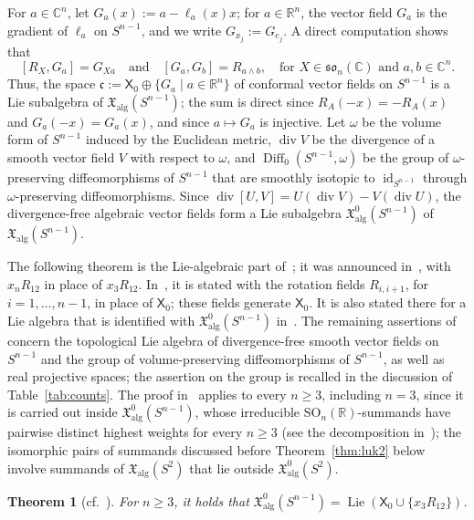 \documentclass{article}
\newcommand{\R}{\mathbb{R}}
\newcommand{\C}{\mathbb{C}}
\newcommand{\frakc}{\mathfrak{c}}
\newcommand{\xalg}{\mathfrak X_{\mathrm{alg}}}
\newcommand{\xalgz}{\mathfrak X^{0}_{\mathrm{alg}}}
\newcommand{\sX}{\mathsf{X}}
\newtheorem{theorem}{Theorem}
\theoremstyle{definition}
\theoremstyle{plain}
\begin{document}
For $a\in\C^n$, let $G_a(x):= a-\ell_a(x)x$; for $a\in\R^n$, the vector field $G_a$ is the gradient of $\ell_a$ on $S^{n-1}$, and we write $G_{x_j}:=G_{e_j}$.
A direct computation shows that
\begin{equation}\label{eq:conformal}
[R_X,G_a]=G_{Xa} \quad\mbox{and}\quad
[G_a,G_b]=R_{a\wedge b}, \quad\mbox{for } X\in\mathfrak{so}_n(\C)\mbox{ and }a,b\in\C^n.
\end{equation}
Thus, the space $\frakc:=\sX_0\oplus\{G_a \mid  a\in\R^n\}$ of conformal vector fields on $S^{n-1}$ is a Lie subalgebra of $\xalg(S^{n-1})$; the sum is direct since $R_A(-x)=-R_A(x)$ and $G_a(-x)=G_a(x)$, and since $a\mapsto G_a$ is injective.
 Let $\omega$ be the volume form of $S^{n-1}$ induced by the Euclidean metric, $\operatorname{div}V$ be the divergence of a smooth vector field $V$ with respect to $\omega$, and $\operatorname{Diff}_0(S^{n-1},\omega)$ be the group of $\omega$-preserving diffeomorphisms of $S^{n-1}$ that are smoothly isotopic to $\operatorname{id}_{S^{n-1}}$ through $\omega$-preserving diffeomorphisms.
Since $\operatorname{div}[U,V]=U(\operatorname{div}V)-V(\operatorname{div}U)$, the divergence-free algebraic vector fields form a Lie subalgebra $\xalgz(S^{n-1})$ of $\xalg(S^{n-1})$.

The following theorem is the Lie-algebraic part of~\cite[Theorem~1]{Luk77}; it was announced in~\cite[Theorem~3]{Luk74}, with $x_nR_{12}$ in place of $x_3R_{12}$.
In~\cite{Luk77}, it is stated with the rotation fields $R_{i,i+1}$, for $i=1,\ldots,n-1$, in place of $\sX_0$; these fields generate $\sX_0$.
It is also stated there for a Lie algebra that is identified with $\xalgz(S^{n-1})$ in~\cite[Lemma~1]{Luk77}.
The remaining assertions of~\cite[Theorem~1]{Luk77} concern the topological Lie algebra of divergence-free smooth vector fields on $S^{n-1}$ and the group of volume-preserving diffeomorphisms of $S^{n-1}$, as well as real projective spaces; the assertion on the group is recalled in the discussion of Table~\ref{tab:counts}.
The proof in~\cite{Luk77} applies to every $n\geq3$, including $n=3$, since it is carried out inside $\xalgz(S^{n-1})$, whose irreducible $\mathrm{SO}_n(\R)$-summands have pairwise distinct highest weights for every $n\geq3$ (see the decomposition in~\cite[p.~120]{Luk77}); the isomorphic pairs of summands discussed before Theorem~\ref{thm:luk2} below involve summands of $\xalg(S^2)$ that lie outside $\xalgz(S^2)$.

\begin{theorem}[cf.~{\cite[Theorem~1]{Luk77}}]\label{thm:luk1}
For $n\geq3$, it holds that $\xalgz(S^{n-1})=\operatorname{Lie}(\sX_0\cup\{x_3R_{12}\})$.
\end{theorem}
\end{document}
